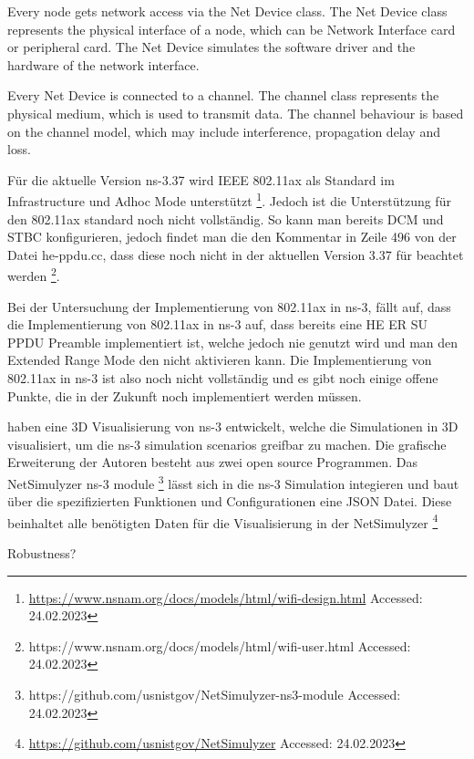 \documentclass[]{nsm-thesis}
\begin{document}
Every node gets network access via the Net Device class. The Net Device class represents the physical interface of a node,
which can be Network Interface card or peripheral card. The Net Device simulates the software driver and the hardware of the network interface.

Every Net Device is connected to a channel. The channel class represents the physical medium, which is used to transmit data. The channel behaviour is based
on the channel model, which may include interference, propagation delay and loss.

Für die aktuelle Version ns-3.37 wird IEEE 802.11ax als Standard im Infrastructure und Adhoc Mode unterstützt \footnote{\url{https://www.nsnam.org/docs/models/html/wifi-design.html} Accessed: 24.02.2023}.
Jedoch ist die Unterstützung für den 802.11ax standard noch nicht vollständig. So kann man bereits DCM und STBC konfigurieren, jedoch findet man die den Kommentar in Zeile 496 von der Datei he-ppdu.cc, dass diese noch nicht in der aktuellen Version 3.37 für beachtet werden \footnote{https://www.nsnam.org/docs/models/html/wifi-user.html Accessed: 24.02.2023}.

Bei der Untersuchung der Implementierung von 802.11ax in ns-3, fällt auf, dass die Implementierung von 802.11ax in ns-3 auf, dass bereits eine HE ER SU \ac{PPDU} Preamble implementiert ist, welche jedoch nie genutzt wird und man den Extended Range Mode
den nicht aktivieren kann. Die Implementierung von 802.11ax in ns-3 ist also noch nicht vollständig und es gibt noch einige offene Punkte, die in der Zukunft noch implementiert werden müssen.

\textcite{black_netsimulyzer_2021} haben eine 3D Visualisierung von ns-3 entwickelt, welche die Simulationen in 3D visualisiert, um die ns-3 simulation
scenarios greifbar zu machen. Die grafische Erweiterung der Autoren besteht aus zwei open source Programmen. Das 
NetSimulyzer ns-3 module \footnote{https://github.com/usnistgov/NetSimulyzer-ns3-module Accessed: 24.02.2023} lässt sich in die ns-3 Simulation integieren und baut über die spezifizierten Funktionen und Configurationen
eine JSON Datei. Diese beinhaltet alle benötigten Daten für die Visualisierung in der NetSimulyzer \footnote{\url{https://github.com/usnistgov/NetSimulyzer} Accessed: 24.02.2023}


Robustness?

\end{document}

